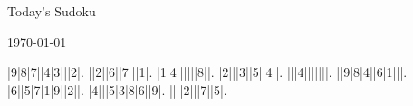 \documentclass{article}
\begin{document}
\begin{center}
\Huge{Today's Sudoku}
\end{center}
\begin{center}
\Large{\today}
\end{center}
\begin{sudoku}
|9|8|7||4|3|||2|.
||2||6||7|||1|.
|1|4||||||8||.
|2|||3||5||4||.
|||4|||||||.
||9|8|4||6|1|||.
|6||5|7|1|9||2||.
|4|||5|3|8|6||9|.
||||2|||7||5|.
\end{sudoku}
\end{document}
